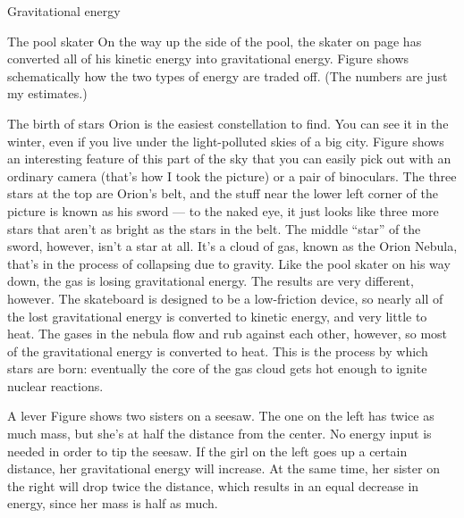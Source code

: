 \begin{envsubsection}{Gravitational energy}
\begin{eg}{The pool skater}\label{eg:skaterenergy}
On the way up the side of the pool, the skater on page \pageref{ch:energy}
has converted all of his kinetic energy into gravitational energy. 
Figure  shows schematically how the two types of energy are traded off.
(The numbers are just my estimates.)
\end{eg}

\begin{eg}{The birth of stars}\label{eg:birthofstars}
Orion is the easiest constellation to find. You can see it in the winter, even if you live
under the light-polluted skies of a big city. Figure  shows an interesting
feature of this part of the sky that you can easily pick out with an ordinary camera (that's how
I took the picture) or a pair of binoculars. The three stars at the top are Orion's belt, and the
stuff near the lower left corner of the picture is known as his sword --- to the naked eye, it
just looks like three more stars that aren't as bright as the stars in the belt. The middle ``star''
of the sword, however, isn't a star at all. It's a cloud of gas, known as the Orion Nebula,
that's in the process of collapsing
due to gravity. Like the pool skater on his way down, the gas is losing gravitational energy.
The results are very different, however. The skateboard is designed to be a low-friction device,
so nearly all  of the lost gravitational energy is converted to kinetic energy, and very little
to heat. The gases in the nebula flow and rub against each other, however, so most of the gravitational
energy is converted to heat. This is the process by which stars are born: eventually the core of
the gas cloud gets hot enough to ignite nuclear reactions.
\end{eg}

\begin{eg}{A lever}\label{eg:lever}
Figure  shows two sisters on a seesaw. The one on the left has twice as
much mass, but she's at half the distance from the center. No energy input is needed in
order to tip the seesaw. If the girl on the left goes up a certain distance, her gravitational
energy will increase. At the same time, her sister on the right will drop twice the distance,
which results in an equal decrease in energy, since her mass is half as much.
\end{eg}


\end{envsubsection}
